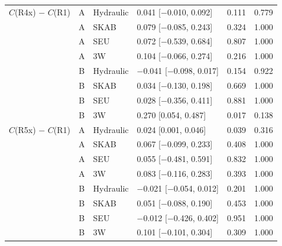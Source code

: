 \begin{tabular}{@{}l c l l rr@{}}
$C$(R4x) $-$ $C$(R1) & A & Hydraulic & 0.041 [$-$0.010, 0.092] & 0.111 & 0.779 \\
 & A & SKAB & 0.079 [$-$0.085, 0.243] & 0.324 & 1.000 \\
 & A & SEU & 0.072 [$-$0.539, 0.684] & 0.807 & 1.000 \\
 & A & 3W & 0.104 [$-$0.066, 0.274] & 0.216 & 1.000 \\
 & B & Hydraulic & $-$0.041 [$-$0.098, 0.017] & 0.154 & 0.922 \\
 & B & SKAB & 0.034 [$-$0.130, 0.198] & 0.669 & 1.000 \\
 & B & SEU & 0.028 [$-$0.356, 0.411] & 0.881 & 1.000 \\
 & B & 3W & 0.270 [0.054, 0.487] & 0.017 & 0.138 \\
$C$(R5x) $-$ $C$(R1) & A & Hydraulic & 0.024 [0.001, 0.046] & 0.039 & 0.316 \\
 & A & SKAB & 0.067 [$-$0.099, 0.233] & 0.408 & 1.000 \\
 & A & SEU & 0.055 [$-$0.481, 0.591] & 0.832 & 1.000 \\
 & A & 3W & 0.083 [$-$0.116, 0.283] & 0.393 & 1.000 \\
 & B & Hydraulic & $-$0.021 [$-$0.054, 0.012] & 0.201 & 1.000 \\
 & B & SKAB & 0.051 [$-$0.088, 0.190] & 0.453 & 1.000 \\
 & B & SEU & $-$0.012 [$-$0.426, 0.402] & 0.951 & 1.000 \\
 & B & 3W & 0.101 [$-$0.101, 0.304] & 0.309 & 1.000 \\
\bottomrule
\end{tabular}
